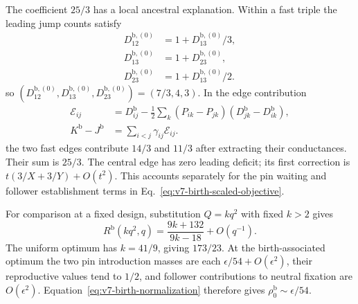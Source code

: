 \documentclass[aps,pre,reprint,amsmath,amssymb,longbibliography]{revtex4-2}
\begin{document}
The coefficient $25/3$ has a local ancestral explanation. Within a
fast triple the leading jump counts satisfy
\begin{equation}
 \begin{aligned}
 D^{\mathrm b,(0)}_{12}&=1+D^{\mathrm b,(0)}_{13}/3,\\
 D^{\mathrm b,(0)}_{13}&=1+D^{\mathrm b,(0)}_{23},\\
 D^{\mathrm b,(0)}_{23}&=1+D^{\mathrm b,(0)}_{13}/2.
 \end{aligned}
 \label{eq:v7-birth-fast-pairs}
\end{equation}
so $(D^{\mathrm b,(0)}_{12},D^{\mathrm b,(0)}_{13},D^{\mathrm b,(0)}_{23})=(7/3,4,3)$. In the edge contribution
\begin{equation}
 \begin{aligned}
 \mathcal E_{ij}&=D^{\mathrm b}_{ij}
 -\frac12\sum_k(P_{ik}-P_{jk})(D^{\mathrm b}_{jk}-D^{\mathrm b}_{ik}),\\
 K^{\mathrm b}-J^{\mathrm b}&=\sum_{i<j}\gamma_{ij}\mathcal E_{ij}.
 \end{aligned}
 \label{eq:v7-birth-edge-deficit}
\end{equation}
the two fast edges contribute $14/3$ and $11/3$ after extracting
their conductances. Their sum is $25/3$. The central edge has zero
leading deficit; its first correction is
$t(3/X+3/Y)+O(t^2)$. This accounts separately for the
pin waiting and follower establishment terms in
Eq.~\eqref{eq:v7-birth-scaled-objective}.

For comparison at a fixed design, substitution $Q=kq^2$ with fixed
$k>2$ gives
\begin{equation}
 R^{\mathrm b}(kq^2,q)=\frac{9k+132}{9k-18}+O(q^{-1}).
 \label{eq:v7-birth-uniform-design}
\end{equation}
The uniform optimum has $k=41/9$, giving $173/23$. At the
birth-associated optimum the two pin introduction masses are each
$\epsilon/54+O(\epsilon^2)$, their reproductive values tend to
$1/2$, and follower contributions to neutral fixation are
$O(\epsilon^2)$. Equation~\eqref{eq:v7-birth-normalization}
therefore gives $\rho_0^{\mathrm b}\sim\epsilon/54$.
\end{document}
